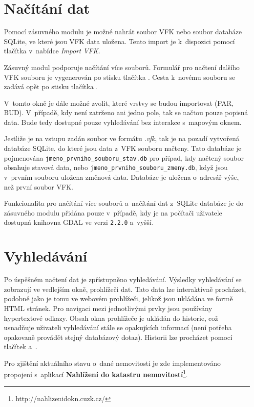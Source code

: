 \documentclass[a4paper,12pt,oneside]{book}
\begin{document}
\section{Načítání dat}
Pomocí zásuvného modulu je možné nahrát soubor VFK nebo soubor databáze SQLite, ve které jsou VFK data uložena. Tento import je k~dispozici pomocí tlačítka  v~nabídce \textit{Import VFK}. 

Zásuvný modul podporuje načítání více souborů. Formulář pro načtení dalšího VFK souboru je vygenerován po stisku tlačítka \uv{+}. Cesta k~novému souboru se zadává opět po stisku tlačítka .

V~tomto okně je dále možné zvolit, které vrstvy se budou importovat (PAR, BUD). V~případě, kdy není zatrženo ani jedno pole, tak se načtou pouze popisná data. Bude tedy dostupné pouze vyhledávání bez interakce s~mapovým oknem. 

Jestliže je na vstupu zadán soubor ve formátu \textit{.vfk}, tak je na pozadí vytvořená databáze SQLite, do které jsou data z~VFK souboru načteny. Tato databáze je pojmenována \texttt{jmeno\_prvniho\_souboru\_stav.db} pro případ, kdy načtený soubor obsahuje stavová data, nebo \texttt{jmeno\_prvniho\_souboru\_zmeny.db}, když jsou v~prvním souboru uložena změnová data. Databáze je uložena o~adresář výše, než první soubor VFK.

Funkcionalita pro načítání více souborů a~načítání dat z~SQLite databáze je do zásuvného modulu přidána pouze v~případě, kdy je na počítači uživatele dostupná knihovna GDAL ve verzi \texttt{2.2.0} a~vyšší. 

\section{Vyhledávání}
Po úspěšném načtení dat je zpřístupněno vyhledávání. Výsledky vyhledávání se zobrazují ve vedlejším okně, prohlížeči dat. Tato data lze interaktivně procházet, podobně jako je tomu ve webovém prohlížeči, jelikož jsou ukládána ve formě HTML stránek. Pro navigaci mezi jednotlivými prvky jsou používány hypertextové odkazy. Obsah okna prohlížeče je ukládán do historie, což usnadňuje uživateli vyhledávání stále se opakujících informací (není potřeba opakovaně provádět stejný databázový dotaz). Historii lze procházet pomocí tlačítek  a~.

Pro zjištění aktuálního stavu o~dané nemovitosti je zde implementováno propojení s~aplikací \textbf{Nahlížení do katastru nemovitostí}\footnote{http://nahlizenidokn.cuzk.cz/}.
\end{document}
